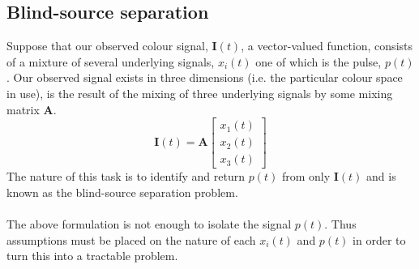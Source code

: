 \subsection{Blind-source separation}
\label{implementation:pca_ica}
Suppose that our observed colour signal, $\mathbf{I}(t)$, a vector-valued function, consists of a mixture of several underlying signals, $x_i(t)$ one of which is the pulse, $p(t)$. 
Our observed signal exists in three dimensions (i.e. the particular colour space in use), is the result of the mixing of three underlying signals by some mixing matrix $\mathbf{A}$.
\begin{equation*}
    \mathbf{I}(t) = \mathbf{A}\begin{bmatrix} x_1(t) \\ x_2(t) \\ x_3(t) \end{bmatrix}
\end{equation*}
The nature of this task is to identify and return $p(t)$ from only $\mathbf{I}(t)$ and is known as the blind-source separation problem. 
\\ \\
The above formulation is not enough to isolate the signal $p(t)$. Thus assumptions must be placed on the nature of each $x_i(t)$ and $p(t)$ in order to turn this into a tractable problem. 

